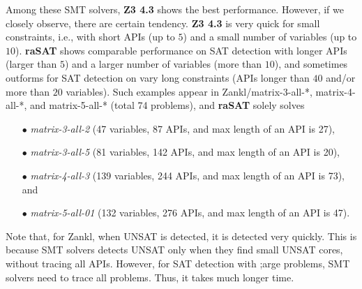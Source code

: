 Among these SMT solvers, {\bf Z3 4.3} shows the best performance. 
However, if we closely observe, there are certain tendency. 
{\bf Z3 4.3} is very quick for small constraints, i.e., with 
short APIs (up to $5$) and a small number of variables (up to $10$). 
{\bf raSAT} shows comparable performance on SAT detection with 
longer APIs (larger than $5$) and a larger number of variables (more than $10$), 
and sometimes outforms for SAT detection on vary long constraints 
(APIs longer than $40$ and/or more than $20$ variables). 
Such examples appear in Zankl/matrix-3-all-*, matrix-4-all-*, and matrix-5-all-* 
(total 74 problems), and {\bf raSAT} solely solves 
\begin{itemize}
\item[$\bullet$] {\em matrix-3-all-2} (47 variables, 87 APIs, and max length of an API is 27), 
\item[$\bullet$] {\em matrix-3-all-5} (81 variables, 142 APIs, and max length of an API is 20), 
\item[$\bullet$] {\em matrix-4-all-3} (139 variables, 244 APIs, and max length of an API is 73), and 
\item[$\bullet$] {\em matrix-5-all-01} (132 variables, 276 APIs, and max length of an API is 47). 
\end{itemize}
Note that, for Zankl, when UNSAT is detected, it is detected very quickly. 
This is because SMT solvers detects UNSAT only when they find small UNSAT cores, 
without tracing all APIs. However, for SAT detection with ;arge problems, 
SMT solvers need to trace all problems. Thus, it takes much longer time. 

\begin{table*}[t]
\centering
{}
\medskip 
\caption{Comparison among SMT solvers} \label{tab:comparison}
\end{table*}


